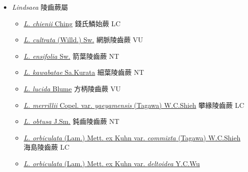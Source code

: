 
  \begin{itemize}
 \item[    ] \textit{Lindsaea} 陵齒蕨屬
                                
  \begin{itemize}
        \item[] \href{http://www.theplantlist.org/tpl1.1/search?q=Lindsaea+chienii}{\textit{L. chienii} Ching}   錢氏鱗始蕨   LC
        \item[] \href{http://www.theplantlist.org/tpl1.1/search?q=Lindsaea+cultrata}{\textit{L. cultrata} (Willd.) Sw.}   網脈陵齒蕨   VU
        \item[] \href{http://www.theplantlist.org/tpl1.1/search?q=Lindsaea+ensifolia}{\textit{L. ensifolia} Sw.}   箭葉陵齒蕨   NT
        \item[] \href{http://www.theplantlist.org/tpl1.1/search?q=Lindsaea+kawabatae}{\textit{L. kawabatae} Sa.Kurata}   細葉陵齒蕨   NT
        \item[] \href{http://www.theplantlist.org/tpl1.1/search?q=Lindsaea+lucida}{\textit{L. lucida} Blume}   方柄陵齒蕨   VU
        \item[] \href{http://www.theplantlist.org/tpl1.1/search?q=Lindsaea+merrillii+var.+yaeyamensis}{\textit{L. merrillii} Copel. var. \textit{yaeyamensis} (Tagawa) W.C.Shieh}  
                                        攀緣陵齒蕨   LC
        \item[] \href{http://www.theplantlist.org/tpl1.1/search?q=Lindsaea+obtusa}{\textit{L. obtusa} J.Sm.}   鈍齒陵齒蕨   NT
        \item[] \href{http://www.theplantlist.org/tpl1.1/search?q=Lindsaea+orbiculata+var.+commixta}{\textit{L. orbiculata} (Lam.) Mett. ex Kuhn var. \textit{commixta} (Tagawa) W.C.Shieh}  
                                        海島陵齒蕨   LC
        \item[] \href{http://www.theplantlist.org/tpl1.1/search?q=Lindsaea+orbiculata+var.+deltoidea}{\textit{L. orbiculata} (Lam.) Mett. ex Kuhn var. \textit{deltoidea} Y.C.Wu}  

\end{itemize}
\end{itemize}
